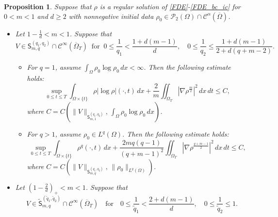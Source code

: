 \documentclass{amsart}
\newtheorem{proposition}[defn]{Proposition}
\numberwithin{equation}{section}
\newcommand{\calC}{{ \mathcal C  }}
\newcommand{\abs}[1]{\left| #1 \right|}
\begin{document}
\begin{proposition}\label{P:energy}
 Suppose that $\rho$ is a regular solution of \eqref{FDE}-\eqref{FDE_bc_ic} for $0<m<1$ and $d\geq 2$ with nonnegative initial data $\rho_{0}\in  \mathcal{P}_2(\Omega) \cap \calC^{\alpha}(\overline{\Omega})$. 

\begin{itemize}
\item[(i)] Let $ 1-\frac{1}{d} < m <1$. Suppose that 
\begin{equation}\label{V:Lq-energy}
V \in \mathsf{S}_{m,q}^{(q_1,q_2)}\cap \calC^{\infty} (\overline{\Omega}_{T})  \ \text{ for }  \   0 \leq \frac{1}{q_1} < \frac{1+d(m-1)}{d}, \quad 0 \leq \frac{1}{q_2}\leq \frac{1+d(m-1)}{2+d(q+m-2)}.
\end{equation}
 
\begin{itemize}
\item[$\bullet$] For $q=1$, assume $\int_{\Omega} \rho_0 \log \rho_0 \,dx < \infty$.
Then the following estimate holds:
\begin{equation}\label{L1-energy}
 \sup_{0\leq t \leq T}  \int_{\Omega \times \{t\}} \rho \abs{\log \rho} (\cdot, t)\,dx
 +  \frac{2}{m}\iint_{\Omega_T} \left|\nabla \rho^{\frac{m}{2}}\right|^2 \,dx\,dt \le C ,
\end{equation}
where  $C = C (\|V\|_{\mathsf{S}_{m,1}^{(q_1, q_2)}}, \, \int_{\Omega} \rho_0 \log \rho_0 \,dx)$. 

\item[$\bullet$] For $q>1$, assume $\rho_0 \in L^q (\Omega)$.
Then the following estimate holds:
\begin{equation}\label{Lq-energy}
 \sup_{0\leq t \leq T}  \int_{\Omega \times \{t\}} \rho^q (\cdot, t) \,dx
 +  \frac{2mq(q-1)}{(q+m-1)^2}\iint_{\Omega_T} \left|\nabla \rho^{\frac{q+m-1}{2}}\right|^2 \,dx\,dt \le C ,
\end{equation}
where  $C = C (\|V\|_{\mathsf{S}_{m,q}^{(q_1, q_2)}}, \, \|\rho_{0}\|_{L^{q} (\Omega)})$.
\end{itemize}

\item[(ii)]  Let $(1-\frac{2}{d})_{+} < m <1$. Suppose that 
\begin{equation}\label{V:tilde:Lq-energy}
V\in \tilde{\mathsf{S}}_{m,q}^{(\tilde{q}_1, \tilde{q}_2)} \cap \calC^{\infty} (\overline{\Omega}_{T}) \quad  \text{for} \quad  0 \leq \frac{1}{\tilde{q}_1} < \frac{2+ d(m-1)}{d}, \quad  0 \leq \frac{1}{\tilde{q}_2} \leq 1. 	 
\end{equation}


\end{itemize}
\end{proposition}
\end{document}

